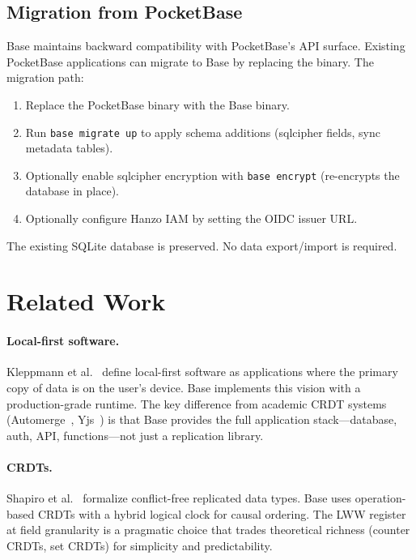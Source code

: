 \documentclass[11pt]{article}
\begin{document}
\subsection{Migration from PocketBase}

Base maintains backward compatibility with PocketBase's API surface. Existing
PocketBase applications can migrate to Base by replacing the binary. The
migration path:

\begin{enumerate}[leftmargin=1.4em]
    \item Replace the PocketBase binary with the Base binary.
    \item Run \texttt{base migrate up} to apply schema additions (sqlcipher
    fields, sync metadata tables).
    \item Optionally enable sqlcipher encryption with \texttt{base encrypt}
    (re-encrypts the database in place).
    \item Optionally configure Hanzo IAM by setting the OIDC issuer URL.
\end{enumerate}

The existing SQLite database is preserved. No data export/import is required.

\section{Related Work}
\label{sec:related}

\paragraph{Local-first software.} Kleppmann et al.~\cite{kleppmann2019} define
local-first software as applications where the primary copy of data is on the
user's device. Base implements this vision with a production-grade runtime.
The key difference from academic CRDT systems (Automerge~\cite{automerge},
Yjs~\cite{yjs}) is that Base provides the full application stack---database,
auth, API, functions---not just a replication library.

\paragraph{CRDTs.} Shapiro et al.~\cite{shapiro2011crdt} formalize
conflict-free replicated data types. Base uses operation-based CRDTs with a
hybrid logical clock for causal ordering. The LWW register at field granularity
is a pragmatic choice that trades theoretical richness (counter CRDTs,
set CRDTs) for simplicity and predictability.
\end{document}
